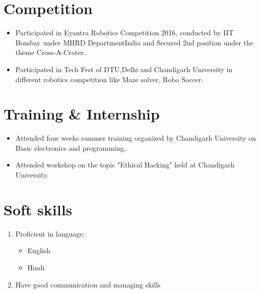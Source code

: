 \documentclass[11pt,a4paper]{article}
\begin{document}
\section*{Competition}
\vspace{-0.7em}\hline \vspace{1.5em}
\begin{itemize} %
\item Participated in Eyantra Robotics Competition 2016, conducted by IIT Bombay under MHRD DepartmentIndia and Secured 2nd position under the theme Cross-A-Crater.
\item Participated in Tech Fest of DTU,Delhi and Chandigarh University in different robotics competition like Maze solver, Robo Soccer.
\end{itemize}


\section*{Training \& Internship}
\vspace{-0.7em}\hline \vspace{1.5em}
\begin{itemize}
\item Attended four weeks summer training organized by Chandigarh University on Basic electronics and programming,
\item Attended workshop on the topic "Ethical Hacking" held at Chandigarh University.

\end{itemize}
\section*{Soft skills}
\vspace{-0.7em}\hline \vspace{1.5em}
\begin{enumerate}
\item Proficient in language:
\begin{itemize}
\item English
\item Hindi

\end{itemize}
\item Have good communication and managing skills
\end{enumerate}
\end{document}
